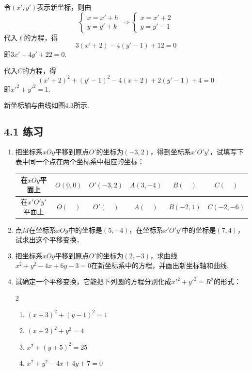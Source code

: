\begin{solution}
    令$(x',y')$表示新坐标，则由
\[\begin{cases}
    x=x'+h \\ y=y'+k
\end{cases}\Rightarrow \begin{cases}
    x=x'+2\\y=y'-1
\end{cases}\]
代入$\ell$的方程，得
\[3(x'+2)-4(y'-1)+12=0\]
即$3x'-4y'+22=0$.

代入$C$的方程，得
\[(x'+2)^2+(y'-1)^2-4(x+2)+2(y'-1)+4=0\]
即${x'}^2+{y'}^2=1$.

新坐标轴与曲线如图4.3所示.
\begin{figure}[htp]
    \centering
{}
    \caption{}
\end{figure}
\end{solution}

\subsection*{4.1 练习}
\begin{enumerate}
    \item 把坐标系$xOy$平移到原点$O'$的坐标为$(-3,2)$，得到坐标系$x'O'y'$，试填写下表中同一个点在两个坐标系中相应的坐标：
\begin{center}
\begin{tabular}{c|ccccc}
\hline
在$xOy$平面上  &   $O(0,0)$ &$O'(-3,2)$& $A(3,-4)$& $B(\quad)$& $C(\quad)$\\
\hline
在$x'O'y'$平面上 & $O(\quad )$ & $O'(\quad )$ &$A(\quad)$&$B(-2,1)$&$C(-2,-6)$\\
\hline    
\end{tabular}
\end{center}
\item 点$M$在坐标系$xOy$中的坐标是$(5,-4)$，在坐标系$x'O'y'$中的坐标是$(7,4)$，试求出这个平移变换．
    \item 把坐标系$xOy$平移到原点$O'$的坐标为$(2,-3)$，求曲线
    $x^2+y^2-4x+6y-3=0$在新坐标系中的方程，并画出新坐标轴和曲线.
    \item 试确定一个平移变换，它能把下列圆的方程分别化成${x'}^2+{y'}^2=R^2$的形式：
\begin{multicols}{2}
\begin{enumerate}[(1)]
\item $(x+3)^2+(y-1)^2=1$
\item $(x+2)^2+y^2=4$
\item $x^2+(y+5)^2=25$
\item $x^2+y^2-4x+4y+7=0$   
\end{enumerate}
\end{multicols}
\end{enumerate}

